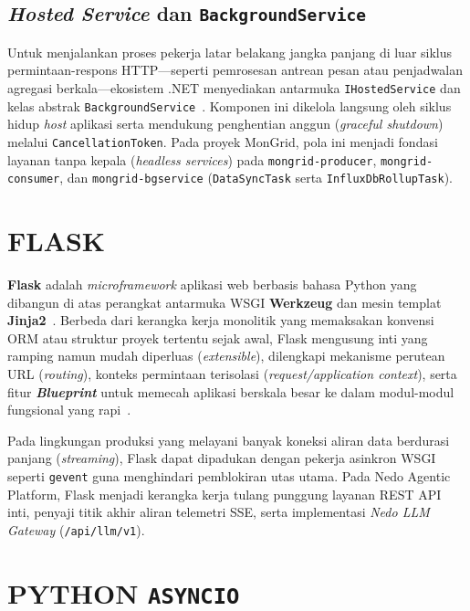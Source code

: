 \subsection{\textit{Hosted Service} dan \texttt{BackgroundService}}

Untuk menjalankan proses pekerja latar belakang jangka panjang di luar siklus permintaan-respons HTTP—seperti pemrosesan antrean pesan atau penjadwalan agregasi berkala—ekosistem .NET menyediakan antarmuka \texttt{IHostedService} dan kelas abstrak \texttt{BackgroundService}~\cite{dotnet_background}. Komponen ini dikelola langsung oleh siklus hidup \textit{host} aplikasi serta mendukung penghentian anggun (\textit{graceful shutdown}) melalui \texttt{CancellationToken}. Pada proyek MonGrid, pola ini menjadi fondasi layanan tanpa kepala (\textit{headless services}) pada \texttt{mongrid-producer}, \texttt{mongrid-consumer}, dan \texttt{mongrid-bgservice} (\texttt{DataSyncTask} serta \texttt{InfluxDbRollupTask}).

\section{FLASK}

\textbf{Flask} adalah \textit{microframework} aplikasi web berbasis bahasa Python yang dibangun di atas perangkat antarmuka WSGI \textbf{Werkzeug} dan mesin templat \textbf{Jinja2}~\cite{flask_doc}. Berbeda dari kerangka kerja monolitik yang memaksakan konvensi ORM atau struktur proyek tertentu sejak awal, Flask mengusung inti yang ramping namun mudah diperluas (\textit{extensible}), dilengkapi mekanisme perutean URL (\textit{routing}), konteks permintaan terisolasi (\textit{request/application context}), serta fitur \textbf{\textit{Blueprint}} untuk memecah aplikasi berskala besar ke dalam modul-modul fungsional yang rapi~\cite{flask_doc}.

Pada lingkungan produksi yang melayani banyak koneksi aliran data berdurasi panjang (\textit{streaming}), Flask dapat dipadukan dengan pekerja asinkron WSGI seperti \texttt{gevent} guna menghindari pemblokiran utas utama. Pada Nedo Agentic Platform, Flask menjadi kerangka kerja tulang punggung layanan REST API inti, penyaji titik akhir aliran telemetri SSE, serta implementasi \textit{Nedo LLM Gateway} (\texttt{/api/llm/v1}).

\section{PYTHON \texttt{ASYNCIO}}

